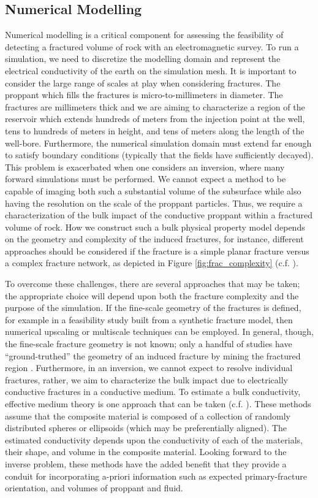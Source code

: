 \subsection{Numerical Modelling}
Numerical modelling is a critical component for assessing the feasibility of detecting a fractured volume of rock with an electromagnetic survey. To run a simulation, we need to discretize the modelling domain and represent the electrical conductivity of the earth on the simulation mesh. It is important to consider the large range of scales at play when considering fractures. The proppant which fills the fractures is micro-to-millimeters in diameter. The fractures are millimeters thick and we are aiming to characterize a region of the reservoir which extends hundreds of meters from the injection point at the well, tens to hundreds of meters in height, and tens of meters along the length of the well-bore. Furthermore, the numerical simulation domain must extend far enough to satisfy boundary conditions (typically that the fields have sufficiently decayed). This problem is exacerbated when one considers an inversion, where many forward simulations must be performed. We cannot expect a method to be capable of imaging both such a substantial volume of the subsurface while also having the resolution on the scale of the proppant particles. Thus, we require a characterization of the bulk impact of the conductive proppant within a fractured volume of rock. How we construct such a bulk physical property model depends on the geometry and complexity of the induced fractures, for instance, different approaches should be considered if the fracture is a simple planar fracture versus a complex fracture network, as depicted in Figure \ref{fig:frac_complexity} (c.f. \cite{Cipolla2008}).

To overcome these challenges, there are several approaches that may be taken; the appropriate choice will depend upon both the fracture complexity and the purpose of the simulation. If the fine-scale geometry of the fractures is defined, for example in a feasibility study built from a synthetic fracture model, then numerical upscaling \citep{Durlofsky2003, CaudilloMata2014, CaudilloMata2016} or multiscale techniques \citep{Haber2014} can be employed. In general, though, the fine-scale fracture geometry is not known; only a handful of studies have ``ground-truthed'' the geometry of an induced fracture by mining the fractured region \citep{Cipolla2008a}. Furthermore, in an inversion, we cannot expect to resolve individual fractures, rather, we aim to characterize the bulk impact due to electrically conductive fractures in a conductive medium. To estimate a bulk conductivity, effective medium theory is one approach that can be taken (c.f. \cite{Torquato2002, Milton2002, Berryman2013}). These methods assume that the composite material is composed of a collection of randomly distributed spheres or ellipsoids (which may be preferentially aligned). The estimated conductivity depends upon the conductivity of each of the materials, their shape, and volume in the composite material. Looking forward to the inverse problem, these methods have the added benefit that they provide a conduit for incorporating a-priori information such as expected primary-fracture orientation, and volumes of proppant and fluid.

